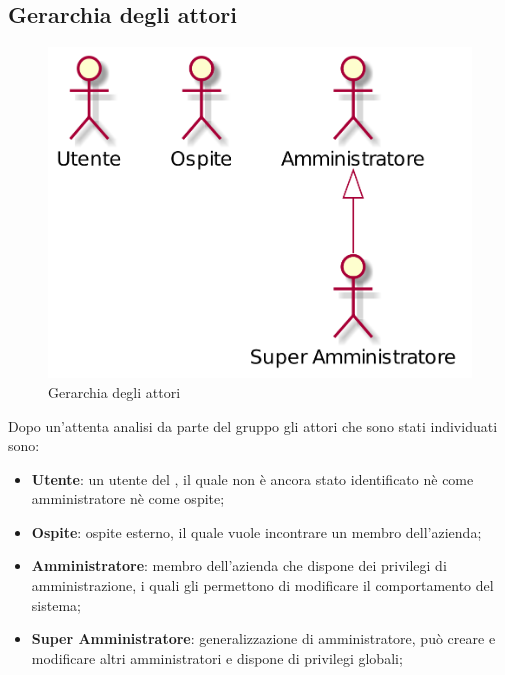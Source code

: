 \subsection{Gerarchia degli attori}
\begin{figure}[h]
  \centering
  \includegraphics[scale=0.4]{images/Attori.png}
  \caption{Gerarchia degli attori}
\end{figure}
Dopo un'attenta analisi da parte del gruppo gli attori che sono stati individuati sono: 
\begin{itemize}
\item \textbf{Utente}: un utente del , il quale non è ancora stato identificato nè come amministratore nè come ospite;
\item \textbf{Ospite}: ospite esterno, il quale vuole incontrare un membro dell'azienda;
\item \textbf{Amministratore}: membro dell'azienda che dispone dei privilegi di amministrazione, i quali gli permettono di modificare il comportamento del sistema;
\item \textbf{Super Amministratore}: generalizzazione di amministratore, può creare e modificare altri amministratori e dispone di privilegi globali;
\end{itemize}